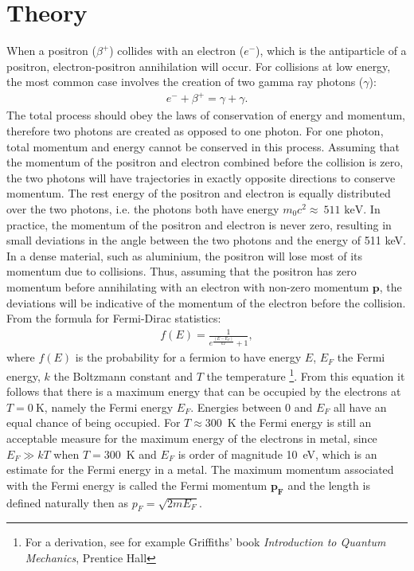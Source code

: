 \section{Theory}
When a positron ($\beta^+$) collides with an electron ($e^-$), which is the antiparticle of a positron, electron-positron annihilation will occur. For collisions at low energy, the most common case involves the creation of two gamma ray photons ($\gamma$):
\begin{gather}
e^-+\beta^+=\gamma + \gamma.
\end{gather} The total process should obey the laws of conservation of energy and momentum, therefore two photons are created as opposed to one photon. For one photon, total momentum and energy cannot be conserved in this process. Assuming that the momentum of the positron and electron combined before the collision is zero, the two photons will have trajectories in exactly opposite directions to conserve momentum. The rest energy of the positron and electron is equally distributed over the two photons, i.e. the photons both have energy $m_0c^2 \approx ~\text{511 keV}$.
In practice, the momentum of the positron and electron is never zero, resulting in small deviations in the angle between the two photons and the energy of 511 keV. In a dense material, such as aluminium, the positron will lose most of its momentum due to collisions. Thus, assuming that the positron has zero momentum before annihilating with an electron with non-zero momentum $\boldsymbol{p}$, the deviations will be indicative of the momentum of the electron before the collision. 
From the formula for Fermi-Dirac statistics: 
\begin{gather}
f(E) = \frac{1}{e^{\frac{(E-E_F)}{kT}}+1},
\end{gather} where $f(E)$ is the probability for a fermion to have energy $E$, $E_F$ the Fermi energy, $k$ the Boltzmann constant and $T$ the temperature \footnote{For a derivation, see for example Griffiths' book \emph{Introduction to Quantum Mechanics}, Prentice Hall}. From this equation it follows that there is a maximum energy that can be occupied by the electrons at $T=0~\text{K}$, namely the Fermi energy $E_F$. Energies between 0 and $E_F$ all have an equal chance of being occupied. For $T\approx 300$~K the Fermi energy is still an acceptable measure for the maximum energy of the electrons in metal, since $E_F \gg kT$ when $T=300$~K and $E_F$ is order of magnitude 10~eV, which is an estimate for the Fermi energy in a metal\cite{ashcroft1976solid}. The maximum momentum associated with the Fermi energy is called the Fermi momentum $\boldsymbol{p_F}$ and the length is defined naturally then as $p_F = \sqrt{2mE_F}$.
